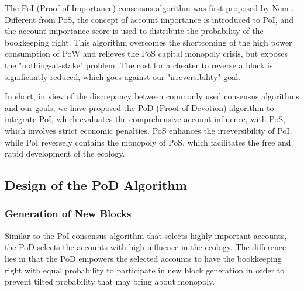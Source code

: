 The PoI (Proof of Importance) consensus algorithm was first proposed by Nem \cite{nem}. Different from PoS, the concept of account importance is introduced to PoI, and the account importance score is used to distribute the probability of the bookkeeping right. This algorithm overcomes the shortcoming of the high power consumption of PoW and relieves the PoS capital monopoly crisis, but exposes the "nothing-at-stake" problem. The cost for a cheater to reverse a block is significantly reduced, which goes against our "irreversibility" goal.


In short, in view of the discrepancy between commonly used consensus algorithms and our goals, we have proposed the PoD (Proof of Devotion) algorithm to integrate PoI, which evaluates the comprehensive account influence, with PoS, which involves strict economic penalties. PoS enhances the irreversibility of PoI, while PoI reversely contains the monopoly of PoS, which facilitates the free and rapid development of the ecology.


\subsection{Design of the PoD Algorithm}
\label{pod:design}

\subsubsection{Generation of New Blocks}
\label{pod:design:block}

Similar to the PoI consensus algorithm that selects highly important accounts, the PoD selects the accounts with high influence in the ecology. The difference lies in that the PoD empowers the selected accounts to have the bookkeeping right with equal probability to participate in new block generation in order to prevent tilted probability that may bring about monopoly.

